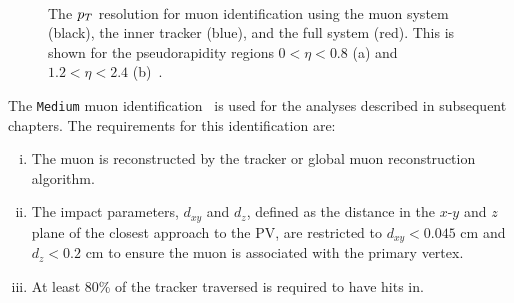 \begin{figure}[t]
\centering
     \\
\caption{The $p_{T}$ resolution for muon identification using the muon system (black), the inner tracker (blue), and the full system (red). This is shown for the pseudorapidity regions $0 < \eta < 0.8$ (a) and  $1.2 < \eta < 2.4$ (b)~\cite{CMS_Setup}.}
\label{fig:muon_eff}
\end{figure}

The \texttt{Medium} muon identification~\cite{CMS:2018rym} is used for the analyses described in subsequent chapters.
The requirements for this identification are:
\begin{enumerate}[i)]
\item The muon is reconstructed by the tracker or global muon reconstruction algorithm.
\item The impact parameters, $d_{xy}$ and $d_{z}$, defined as the distance in the $x$-$y$ and $z$ plane of the closest approach to the \ac{PV}, are restricted to $d_{xy}<0.045$ cm and $d_{z}<0.2$ cm to ensure the muon is associated with the primary vertex.
\item At least 80\% of the tracker traversed is required to have hits in.
\end{enumerate}

